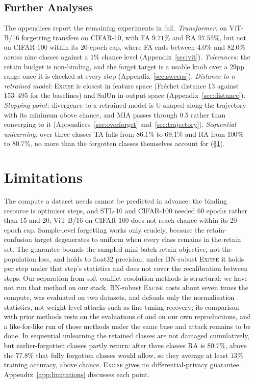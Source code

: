\documentclass{article}
\newcommand{\ours}{\textsc{Excise}}
\newcommand{\rev}[1]{{\color{revisedB}#1}}
\theoremstyle{remark}
\theoremstyle{plain}
\begin{document}
\subsection{Further Analyses}\label{sec:further}

The appendices report the remaining experiments in full. \emph{Transformer:} on
ViT-B/16 forgetting transfers \rev{on CIFAR-10}, with FA $9.71\%$ and RA
$97.55\%$, \rev{but not on CIFAR-100 within its 20-epoch cap, where FA ends
between $4.0\%$ and $82.0\%$ across nine classes against a $1\%$ chance level}
(Appendix~\ref{sec:vit}). \emph{Tolerances:} the retain budget is non-binding,
and the forget target is a usable knob over a $29$pp range once it is checked at
every step (Appendix~\ref{sec:sweeps}). \emph{Distance to a retrained model:}
\ours{} is closest in feature space (Fr\'echet distance $13$ against
$153$--$495$ for the baselines) and SalUn in output space
(Appendix~\ref{sec:distance}). \emph{Stopping point:} divergence to a retrained
model is U-shaped along the trajectory with its minimum above chance, and MIA
passes through $0.5$ rather than converging to it
(Appendices~\ref{sec:overforget} and~\ref{sec:trajectory}). \rev{\emph{Sequential
unlearning:} over three classes TA falls from $86.1\%$ to $69.1\%$ and RA from
$100\%$ to $80.7\%$, no more than the forgotten classes themselves account for
(\S\ref{sec:limitations}).}

\section{Limitations}\label{sec:limitations}

The compute a dataset needs cannot be predicted in advance: the binding resource
is optimiser steps, and STL-10 and CIFAR-100 needed 60 epochs rather than 15 and
20\rev{; ViT-B/16 on CIFAR-100 does not reach chance within its 20-epoch cap}.
Sample-level forgetting works only crudely, because the retain-confusion
target degenerates to uniform when every class remains in the retain set. The
guarantee bounds the sampled mini-batch retain objective, not the population
loss, and holds to float32 precision\rev{; under BN-robust \ours{} it holds per
step under that step's statistics and does not cover the recalibration between
steps}. Our separation from soft conflict-resolution methods
\citep{patel2025learning} is structural; we have not run that method on our
stack. BN-robust \ours{} costs about seven times the compute, was evaluated on
two datasets, and defends only the normalisation statistics, not weight-level
attacks such as fine-tuning recovery\rev{; its comparison with prior methods
rests on the evaluations of \citet{kalani2026batchnorm} and on our own
reproductions, and a like-for-like run of those methods under the same base and
attack remains to be done. In sequential unlearning the retained classes are not
damaged cumulatively, but earlier-forgotten classes partly return: after three
classes RA is $80.7\%$, above the $77.8\%$ that fully forgotten classes would
allow, so they average at least $13\%$ training accuracy, above chance.} \ours{}
gives no differential-privacy guarantee. Appendix~\ref{app:limitations}
discusses each point.
\end{document}

